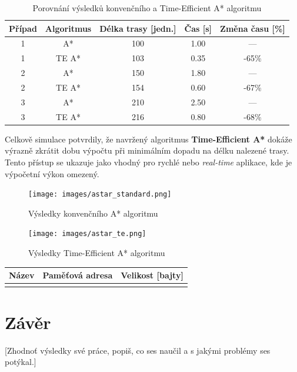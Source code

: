 \documentclass[10pt, a4paper]{article}
\begin{document}
\begin{table}[H]
\centering
\caption{Porovnání výsledků konvenčního a Time-Efficient A* algoritmu}
\label{tab:comparison}
\begin{tabular}{|c|c|c|c|c|}
\hline
\textbf{Případ} & \textbf{Algoritmus} & \textbf{Délka trasy [jedn.]} & \textbf{Čas [s]} & \textbf{Změna času [\%]} \\ \hline
1 & A* & 100 & 1.00 & --- \\ \hline
1 & TE A* & 103 & 0.35 & -65\% \\ \hline
2 & A* & 150 & 1.80 & --- \\ \hline
2 & TE A* & 154 & 0.60 & -67\% \\ \hline
3 & A* & 210 & 2.50 & --- \\ \hline
3 & TE A* & 216 & 0.80 & -68\% \\ \hline
\end{tabular}
\end{table}

Celkově simulace potvrdily, že navržený algoritmus \textbf{Time-Efficient A*} dokáže výrazně zkrátit dobu výpočtu při minimálním dopadu na délku nalezené trasy.
Tento přístup se ukazuje jako vhodný pro rychlé nebo \textit{real-time} aplikace, kde je výpočetní výkon omezený.

\begin{figure}[H]
\centering
\texttt{[image: images/astar\_standard.png]}
\caption{Výsledky konvenčního A* algoritmu}
\label{fig:astar_standard}
\end{figure}

\begin{figure}[H]
\centering
\texttt{[image: images/astar\_te.png]}
\caption{Výsledky Time-Efficient A* algoritmu}
\label{fig:astar_te}
\end{figure}


\begin{center}
    \begin{tabularx}{0.8\textwidth}{
        | >{\raggedright\arraybackslash}X
        | >{\raggedright\arraybackslash}X
        | >{\raggedright\arraybackslash}X | }
         \hline
         Název & Paměťová adresa & Velikost [bajty] \\
         \hline
         [doplň údaje] &  &  \\
         \hline
    \end{tabularx}
\end{center}

\section{Závěr}
[Zhodnoť výsledky své práce, popiš, co ses naučil a s jakými problémy ses potýkal.]

\newpage


\end{document}
